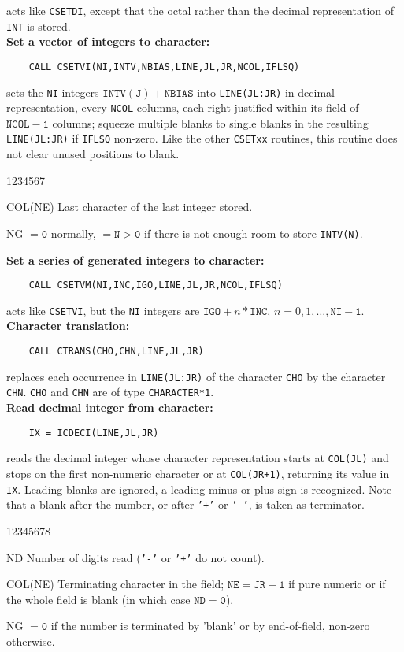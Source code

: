 acts like {\tt CSETDI}, except that the octal rather than
the decimal representation of {\tt INT} is stored. \\[2mm]
\newpage
{\bf Set a vector of integers to character:}
\begin{verbatim}
    CALL CSETVI(NI,INTV,NBIAS,LINE,JL,JR,NCOL,IFLSQ)
\end{verbatim}
sets the {\tt NI} integers $\mathtt{INTV(J)+NBIAS}$ into
{\tt LINE(JL:JR)} in decimal representation,
every {\tt NCOL} columns, each right-justified
within its field of $\mathtt{NCOL-1}$ columns; squeeze multiple blanks
to single blanks in the resulting {\tt LINE(JL:JR)} if {\tt IFLSQ}
non-zero. Like the other {\tt CSETxx} routines, this routine does not
clear unused positions to blank.
\begin{DLtt}{1234567}
\item[COL(NE)] Last character of the last integer stored.
\item[NG] $\mathtt{=0}$ normally, $\mathtt{=N>0}$ if there is
not enough room to store {\tt INTV(N)}.
\end{DLtt}
{\bf Set a series of generated integers to character:}
\begin{verbatim}
    CALL CSETVM(NI,INC,IGO,LINE,JL,JR,NCOL,IFLSQ)
\end{verbatim}
acts like {\tt CSETVI}, but the  {\tt NI} integers are
$\mathtt{IGO}+n*\mathtt{INC}$, $n=0,1,\ldots,\mathtt{NI-1}$. \\[2mm]
{\bf Character translation:}
\begin{verbatim}
    CALL CTRANS(CHO,CHN,LINE,JL,JR)
\end{verbatim}
replaces each occurrence in {\tt LINE(JL:JR)} of the character {\tt CHO}
by the character {\tt CHN}. {\tt CHO} and {\tt CHN} are of type
{\tt CHARACTER*1}.  \\[2mm]
{\bf Read decimal integer from character:}
\begin{verbatim}
    IX = ICDECI(LINE,JL,JR)
\end{verbatim}
reads the decimal integer whose character representation starts
at {\tt COL(JL)} and stops on the first non-numeric character or at
{\tt COL(JR+1)}, returning its value in {\tt IX}. Leading blanks are
ignored, a leading minus or plus sign is recognized. Note that a blank
after the number, or after {\tt '+'} or {\tt '-'}, is taken as
terminator.
\begin{DLtt}{12345678}
\item[ND] Number of digits read ({\tt '-'} or {\tt '+'} do not count).
\item[COL(NE)] Terminating character in the field; $\mathtt{NE=JR+1}$ if
pure numeric or if the whole field is blank (in which case
$\mathtt{ND=0}$).
\item[NG] $\mathtt{=0}$ if the number is terminated by 'blank'
or by end-of-field, non-zero otherwise.
\end{DLtt}
